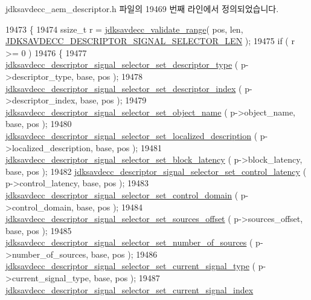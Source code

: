 jdksavdecc\+\_\+aem\+\_\+descriptor.\+h 파일의 19469 번째 라인에서 정의되었습니다.


\begin{DoxyCode}
19473 \{
19474     ssize\_t r = \hyperlink{group__util_ga9c02bdfe76c69163647c3196db7a73a1}{jdksavdecc\_validate\_range}( pos, len, 
      \hyperlink{group__descriptor__signal__selector_gac2216dd9d51df77aa73eb7459e73022c}{JDKSAVDECC\_DESCRIPTOR\_SIGNAL\_SELECTOR\_LEN} );
19475     \textcolor{keywordflow}{if} ( r >= 0 )
19476     \{
19477         \hyperlink{group__descriptor__signal__selector_ga6f01d6d942f5c1bfa6779727180b2c4b}{jdksavdecc\_descriptor\_signal\_selector\_set\_descriptor\_type}
      ( p->descriptor\_type, base, pos );
19478         \hyperlink{group__descriptor__signal__selector_ga5d26f0d837682a4616604f6947c17347}{jdksavdecc\_descriptor\_signal\_selector\_set\_descriptor\_index}
      ( p->descriptor\_index, base, pos );
19479         \hyperlink{group__descriptor__signal__selector_ga58c520bfbc21f4e547c8495af1ef4e07}{jdksavdecc\_descriptor\_signal\_selector\_set\_object\_name}
      ( p->object\_name, base, pos );
19480         \hyperlink{group__descriptor__signal__selector_gaabaa06961aea7af702f8e7a8f4430390}{jdksavdecc\_descriptor\_signal\_selector\_set\_localized\_description}
      ( p->localized\_description, base, pos );
19481         \hyperlink{group__descriptor__signal__selector_ga14a423ff793bff3ff5960aa14a7b3d77}{jdksavdecc\_descriptor\_signal\_selector\_set\_block\_latency}
      ( p->block\_latency, base, pos );
19482         \hyperlink{group__descriptor__signal__selector_gabf0f93f39cc9d1ae4a89a556d0155e1f}{jdksavdecc\_descriptor\_signal\_selector\_set\_control\_latency}
      ( p->control\_latency, base, pos );
19483         \hyperlink{group__descriptor__signal__selector_gaf0f01f648cd33b473f499ffbba32561d}{jdksavdecc\_descriptor\_signal\_selector\_set\_control\_domain}
      ( p->control\_domain, base, pos );
19484         \hyperlink{group__descriptor__signal__selector_ga75088bdf711488518319deec07bc1b31}{jdksavdecc\_descriptor\_signal\_selector\_set\_sources\_offset}
      ( p->sources\_offset, base, pos );
19485         \hyperlink{group__descriptor__signal__selector_ga47a775312ce13802763add529a785013}{jdksavdecc\_descriptor\_signal\_selector\_set\_number\_of\_sources}
      ( p->number\_of\_sources, base, pos );
19486         \hyperlink{group__descriptor__signal__selector_ga4d4b21799573f0c459e060af4455e73b}{jdksavdecc\_descriptor\_signal\_selector\_set\_current\_signal\_type}
      ( p->current\_signal\_type, base, pos );
19487         \hyperlink{group__descriptor__signal__selector_ga496cd6a6f15472a803fb8eb97eb9b668}{jdksavdecc\_descriptor\_signal\_selector\_set\_current\_signal\_index}

\end{DoxyCode}

